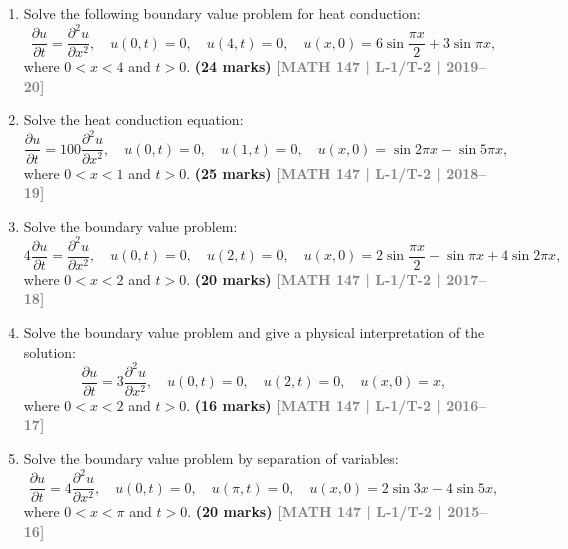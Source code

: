\documentclass[12pt]{article}
\newcommand{\yr}[1]{\hfill\textcolor{gray}{\small\textbf{[#1]}}}
\newcommand{\mk}[1]{\textcolor{orange!70!black}{\small\textbf{(#1 marks)}}}
\begin{document}
\begin{enumerate}
\item Solve the following boundary value problem for heat conduction:
\[
\frac{\partial u}{\partial t}=\frac{\partial^{2}u}{\partial x^{2}},\quad u(0,t)=0,\quad u(4,t)=0,\quad u(x,0)=6\sin\frac{\pi x}{2}+3\sin\pi x,
\]
where $0<x<4$ and $t>0$.
\mk{24} \yr{MATH 147 | L-1/T-2 | 2019--20}

\item Solve the heat conduction equation:
\[
\frac{\partial u}{\partial t}=100\frac{\partial^{2}u}{\partial x^{2}},\quad u(0,t)=0,\quad u(1,t)=0,\quad u(x,0)=\sin 2\pi x-\sin 5\pi x,
\]
where $0<x<1$ and $t>0$.
\mk{25} \yr{MATH 147 | L-1/T-2 | 2018--19}

\item Solve the boundary value problem:
\[
4\frac{\partial u}{\partial t}=\frac{\partial^{2}u}{\partial x^{2}},\quad u(0,t)=0,\quad u(2,t)=0,\quad u(x,0)=2\sin\frac{\pi x}{2}-\sin\pi x+4\sin 2\pi x,
\]
where $0<x<2$ and $t>0$.
\mk{20} \yr{MATH 147 | L-1/T-2 | 2017--18}

\item Solve the boundary value problem and give a physical interpretation of the solution:
\[
\frac{\partial u}{\partial t}=3\frac{\partial^{2}u}{\partial x^{2}},\quad u(0,t)=0,\quad u(2,t)=0,\quad u(x,0)=x,
\]
where $0<x<2$ and $t>0$.
\mk{16} \yr{MATH 147 | L-1/T-2 | 2016--17}

\item Solve the boundary value problem by separation of variables:
\[
\frac{\partial u}{\partial t}=4\frac{\partial^{2}u}{\partial x^{2}},\quad u(0,t)=0,\quad u(\pi,t)=0,\quad u(x,0)=2\sin 3x-4\sin 5x,
\]
where $0<x<\pi$ and $t>0$.
\mk{20} \yr{MATH 147 | L-1/T-2 | 2015--16}

\end{enumerate}
\end{document}
